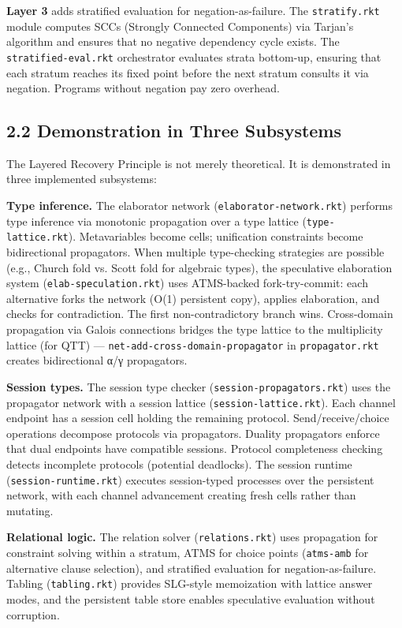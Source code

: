 \documentclass[11pt]{article}
\begin{document}
\textbf{Layer 3} adds stratified evaluation for negation-as-failure. The \texttt{stratify.rkt}
module computes SCCs (Strongly Connected Components) via Tarjan's algorithm and
ensures that no negative dependency cycle exists. The \texttt{stratified-eval.rkt}
orchestrator evaluates strata bottom-up, ensuring that each stratum reaches its
fixed point before the next stratum consults it via negation. Programs without
negation pay zero overhead.
\subsection{2.2 Demonstration in Three Subsystems}
\label{sec:orgbe65fef}

The Layered Recovery Principle is not merely theoretical. It is demonstrated in
three implemented subsystems:

\textbf{Type inference.} The elaborator network (\texttt{elaborator-network.rkt}) performs type
inference via monotonic propagation over a type lattice (\texttt{type-lattice.rkt}).
Metavariables become cells; unification constraints become bidirectional
propagators. When multiple type-checking strategies are possible (e.g., Church
fold vs. Scott fold for algebraic types), the speculative elaboration system
(\texttt{elab-speculation.rkt}) uses ATMS-backed fork-try-commit: each alternative forks
the network (O(1) persistent copy), applies elaboration, and checks for
contradiction. The first non-contradictory branch wins. Cross-domain propagation
via Galois connections bridges the type lattice to the multiplicity lattice (for
QTT) --- \texttt{net-add-cross-domain-propagator} in \texttt{propagator.rkt} creates
bidirectional α/γ propagators.

\textbf{Session types.} The session type checker (\texttt{session-propagators.rkt}) uses the
propagator network with a session lattice (\texttt{session-lattice.rkt}). Each channel
endpoint has a session cell holding the remaining protocol. Send/receive/choice
operations decompose protocols via propagators. Duality propagators enforce that
dual endpoints have compatible sessions. Protocol completeness checking detects
incomplete protocols (potential deadlocks). The session runtime
(\texttt{session-runtime.rkt}) executes session-typed processes over the persistent
network, with each channel advancement creating fresh cells rather than mutating.

\textbf{Relational logic.} The relation solver (\texttt{relations.rkt}) uses propagation for
constraint solving within a stratum, ATMS for choice points (\texttt{atms-amb} for
alternative clause selection), and stratified evaluation for negation-as-failure.
Tabling (\texttt{tabling.rkt}) provides SLG-style memoization with lattice answer modes,
and the persistent table store enables speculative evaluation without corruption.
\end{document}
